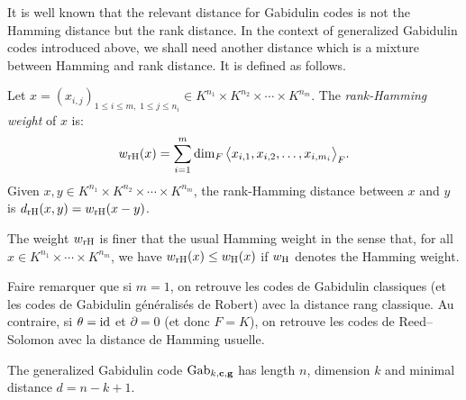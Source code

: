 \documentclass[a4paper]{llncs}
\def\todo#1{{\color{todo} #1}}
\newcommand{\id}{\textrm{\rm id}}
\newcommand{\bc}{\textbf{c}}
\newcommand{\bg}{\textbf{g}}
\newcommand{\Gab}{\textrm{\rm Gab}}
\newcommand{\wH}{w_{\textrm{\rm H}}}
\newcommand{\wrH}{w_{\textrm{\rm rH}}}
\newcommand{\drH}{d_{\textrm{\rm rH}}}
\begin{document}
It is well known that the relevant distance for Gabidulin codes is 
not the Hamming distance but the rank distance. In the context of 
generalized Gabidulin codes introduced above, we shall need another
distance which is a mixture between Hamming and rank distance. It is
defined as follows.

\begin{definition}%
Let $x = (x_{i,j})_{1 \leq i \leq m, \; 1 \leq j \leq n_i} \in
K^{n_1} \times K^{n_2} \times \cdots \times K^{n_m}$.
The \emph{rank-Hamming weight} of $x$ is:
$$\wrH(x) = 
\sum_{i=1}^m \dim_F \big< x_{i,1}, x_{i,2}, \ldots, x_{i,{m_i}} \big>_F.$$
Given $x, y \in K^{n_1} \times K^{n_2} \times \cdots \times K^{n_m}$, 
the {rank-Hamming distance} between $x$ and $y$ is $\drH(x,y) = 
\wrH(x-y)$.
\end{definition}

\begin{remark}
The weight $\wrH$ is finer that the usual Hamming weight in the 
sense that, for all $x \in K^{n_1} \times \cdots \times K^{n_m}$, 
we have $\wrH(x) \leq \wH(x)$ if $\wH$ denotes the Hamming weight.
\end{remark}

\todo{Faire remarquer que si $m = 1$, on retrouve les codes de 
Gabidulin classiques (et les codes de Gabidulin généralisés de Robert)
avec la distance rang classique.
Au contraire, si $\theta = \id$ et $\partial = 0$ (et donc $F = K$),
on retrouve les codes de Reed--Solomon avec la distance de Hamming
usuelle.}

\begin{proposition}
The generalized Gabidulin code $\Gab_{k,\bc,\bg}$ has length $n$,
dimension $k$ and minimal distance $d = n - k + 1$.
\end{proposition}
\end{document}
